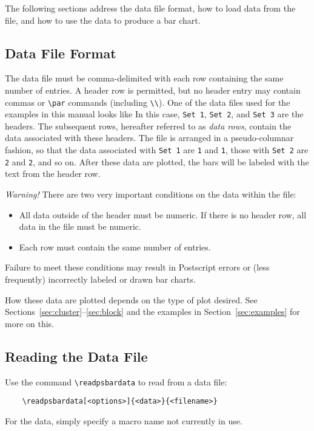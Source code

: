 \documentclass[11pt,english,BCOR10mm,DIV12,bibliography=totoc,parskip=false,smallheadings
    headexclude,footexclude,oneside]{pst-doc}
\begin{document}
    The following sections address the data file format, how to load data from
    the file, and how to use the data to produce a bar chart.

    \subsection{Data File Format}
      The data file must be comma-delimited with each row containing the same
      number of entries. A header row is permitted, but no header entry may
      contain commas or \verb|\par| commands (including \verb|\\|). One of the
      data files used for the examples in this manual looks like
      In this case, \verb|Set 1|, \verb|Set 2|, and \verb|Set 3| are the
      headers. The subsequent rows, hereafter referred to as \emph{data rows},
      contain the data associated with these headers. The file is arranged in a
      pseudo-columnar fashion, so that the data associated with \verb|Set 1|
      are \verb|1| and \verb|1|, those with \verb|Set 2| are \verb|2| and
      \verb|2|, and so on. After these data are plotted, the bars will be
      labeled with the text from the header row.

      \emph{Warning!} There are two very important conditions on the data
      within the file:
      \begin{itemize}
        \item All data outside of the header must be numeric. If there is no
          header row, all data in the file must be numeric.
        \item Each row must contain the same number of entries.
      \end{itemize}
      Failure to meet these conditions may result in Postscript errors or (less
      frequently) incorrectly labeled or drawn bar charts.

      How these data are plotted depends on the type of plot desired. See
      Sections~\ref{sec:cluster}--\ref{sec:block} and the examples in
      Section~\ref{sec:examples} for more on this.

    \subsection{Reading the Data File}
      Use the command \verb|\readpsbardata| to read from a data file:
      \begin{verbatim}
    \readpsbardata[<options>]{<data>}{<filename>}\end{verbatim}
      For the data, simply specify a macro name not currently in use.
\end{document}
